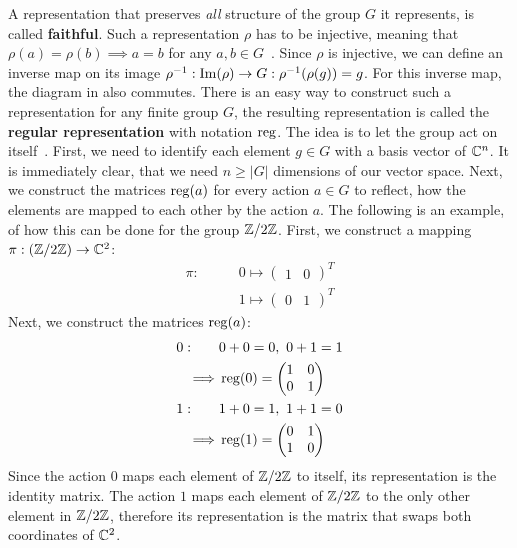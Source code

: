 A representation that preserves \textit{all} structure of the group $G$ it represents, is called \textbf{faithful}.
Such a representation $\rho$ has to be injective, meaning that $\rho(a) = \rho(b) \implies a = b$ for any $a, b \in G$~\cite{Hein2013}.
Since $\rho$ is injective, we can define an inverse map on its image $\rho^{-1}: \operatorname{Im}(\rho) \to G: \rho^{-1}(\rho(g)) = g$.
For this inverse map, the diagram in  also commutes.
There is an easy way to construct such a representation for any finite group $G$, the resulting representation is called the \textbf{regular representation} with notation $\operatorname{reg}$.
The idea is to let the group act on itself~\cite{Fulton2013}.
First, we need to identify each element $g \in G$ with a basis vector of $\mathbb{C}^n$.
It is immediately clear, that we need $n \geq |G|$ dimensions of our vector space.
Next, we construct the matrices $\operatorname{reg}(a)$ for every action $a \in G$ to reflect, how the elements are mapped to each other by the action $a$.
The following is an example, of how this can be done for the group $\mathbb{Z}/2\mathbb{Z}$.
First, we construct a mapping $\pi: (\mathbb{Z}/2\mathbb{Z}) \to \mathbb{C}^2$:
\begin{align*}
    \pi: \qquad & 0 \mapsto \begin{pmatrix}
        1 & 0
    \end{pmatrix}^T \\
    & 1 \mapsto \begin{pmatrix}
        0 & 1
    \end{pmatrix}^T
\end{align*}
Next, we construct the matrices $\operatorname{reg}(a)$:
\begin{align*}
    0: \qquad & 0 + 0 = 0,\ 0 + 1 = 1 \\
    \implies & \operatorname{reg}(0) = \begin{pmatrix}
        1 & 0 \\
        0 & 1
    \end{pmatrix} \\
    1: \qquad & 1 + 0 = 1,\ 1 + 1 = 0 \\
    \implies & \operatorname{reg}(1) = \begin{pmatrix}
        0 & 1 \\
        1 & 0
    \end{pmatrix}
\end{align*}
Since the action $0$ maps each element of $\mathbb{Z}/2\mathbb{Z}$ to itself, its representation is the identity matrix.
The action $1$ maps each element of $\mathbb{Z}/2\mathbb{Z}$ to the only other element in $\mathbb{Z}/2\mathbb{Z}$, therefore its representation is the matrix that swaps both coordinates of $\mathbb{C}^2$.

